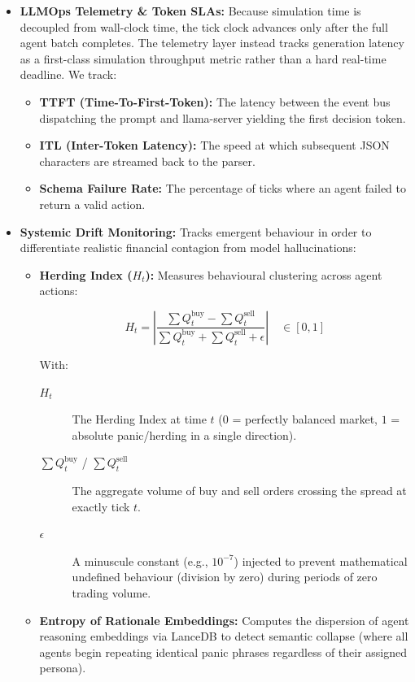 \documentclass[10pt,a4paper]{article}
\begin{document}
\begin{itemize}
    \item \textbf{LLMOps Telemetry \& Token SLAs:} Because simulation time is decoupled from wall-clock time, the tick clock advances only after the full agent batch completes. The telemetry layer instead tracks generation latency as a first-class simulation throughput metric rather than a hard real-time deadline. We track:
    \begin{itemize}
        \item \textbf{TTFT (Time-To-First-Token):} The latency between the event bus dispatching the prompt and llama-server yielding the first decision token.
        \item \textbf{ITL (Inter-Token Latency):} The speed at which subsequent JSON characters are streamed back to the parser.
        \item \textbf{Schema Failure Rate:} The percentage of ticks where an agent failed to return a valid action.
    \end{itemize}
    \item \textbf{Systemic Drift Monitoring:} Tracks emergent behaviour in order to differentiate realistic financial contagion from model hallucinations:
    \begin{itemize}
        \item \textbf{Herding Index ($H_t$):} Measures behavioural clustering across agent actions:
        
        \[ H_t = \left\vert{} \frac{\sum Q_{t}^{\text{buy}} - \sum Q_{t}^{\text{sell}}}{\sum Q_{t}^{\text{buy}} + \sum Q_{t}^{\text{sell}} + \epsilon} \right\vert{} \quad \in [0, 1] \]
        
        With:
        \begin{description}
            \item[$H_t$] The Herding Index at time $t$ ($0$ = perfectly balanced market, $1$ = absolute panic/herding in a single direction).
            \item[$\sum Q_{t}^{\text{buy}}$ / $\sum Q_{t}^{\text{sell}}$] The aggregate volume of buy and sell orders crossing the spread at exactly tick $t$.
            \item[$\epsilon$] A minuscule constant (e.g., $10^{-7}$) injected to prevent mathematical undefined behaviour (division by zero) during periods of zero trading volume.
        \end{description}
        
        \item \textbf{Entropy of Rationale Embeddings:} Computes the dispersion of agent reasoning embeddings via LanceDB to detect semantic collapse (where all agents begin repeating identical panic phrases regardless of their assigned persona).
    \end{itemize}
\end{itemize}
\end{document}
